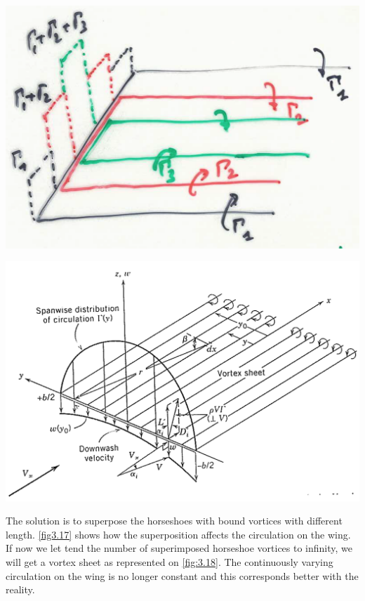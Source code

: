 	\begin{center}
	\begin{minipage}{0.4\textwidth}
	\includegraphics[scale=0.25]{ch3/17}
	\label{fig:3.17}
	\end{minipage}
	\begin{minipage}{0.4\textwidth}
	\includegraphics[scale=0.22]{ch3/18}
	\label{fig:3.18}
	\end{minipage}
	\end{center}
	
	The solution is to superpose the horseshoes with bound vortices with different length. \autoref{fig3.17} shows how the superposition affects the circulation on the wing. If now we let tend the number of superimposed horseshoe vortices to infinity, we will get a vortex sheet as represented on \autoref{fig:3.18}. The continuously varying circulation on the wing is no longer constant and this corresponds better with the reality. 
	
